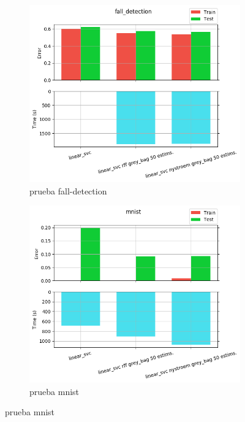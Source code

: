 \begin{figure}[ht]
  \centering
  \begin{subfigure}[b]{0.5\linewidth}
    \centering\captionsetup{width=.8\linewidth}\includegraphics[width=\imgscale\linewidth]{Figures/2_7/fall_detection}
    \caption{prueba fall-detection}
    \label{fig:2_7_fall_detection}
  \end{subfigure}%
  \begin{subfigure}[b]{0.5\linewidth}
    \centering\captionsetup{width=.8\linewidth}\includegraphics[width=\imgscale\linewidth]{Figures/2_7/mnist}
    \caption{prueba mnist}
    \label{fig:2_7_mnist}
  \end{subfigure}
\end{figure}


